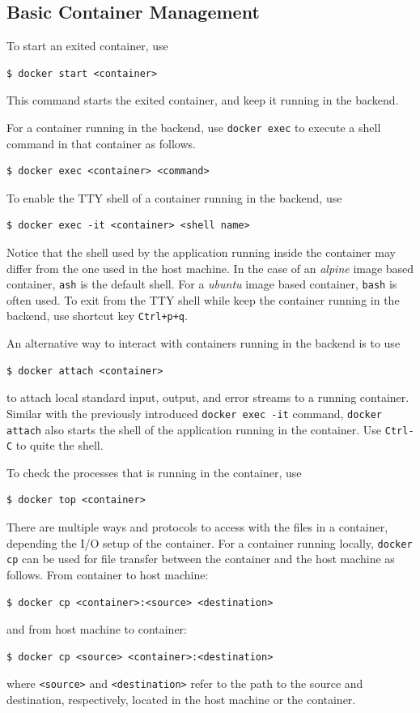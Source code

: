 \subsection{Basic Container Management}

To start an exited container, use
\begin{lstlisting}
$ docker start <container>
\end{lstlisting}
This command starts the exited container, and keep it running in the backend.

For a container running in the backend, use \verb|docker exec| to execute a shell command in that container as follows.
\begin{lstlisting}
$ docker exec <container> <command>
\end{lstlisting}

To enable the TTY shell of a container running in the backend, use
\begin{lstlisting}
$ docker exec -it <container> <shell name>
\end{lstlisting}
Notice that the shell used by the application running inside the container may differ from the one used in the host machine. In the case of an \textit{alpine} image based container, \verb|ash| is the default shell. For a \textit{ubuntu} image based container, \verb|bash| is often used. To exit from the TTY shell while keep the container running in the backend, use shortcut key \verb|Ctrl+p+q|.

An alternative way to interact with containers running in the backend is to use
\begin{lstlisting}
$ docker attach <container>
\end{lstlisting}
to attach local standard input, output, and error streams to a running container. Similar with the previously introduced \texttt{docker exec -it} command, \texttt{docker attach} also starts the shell of the application running in the container. Use \verb|Ctrl-C| to quite the shell.

To check the processes that is running in the container, use
\begin{lstlisting}
$ docker top <container>
\end{lstlisting}

There are multiple ways and protocols to access with the files in a container, depending the I/O setup of the container. For a container running locally, \verb|docker cp| can be used for file transfer between the container and the host machine as follows. From container to host machine:
\begin{lstlisting}
$ docker cp <container>:<source> <destination>
\end{lstlisting}
and from host machine to container:
\begin{lstlisting}
$ docker cp <source> <container>:<destination>
\end{lstlisting}
where \verb|<source>| and \verb|<destination>| refer to the path to the source and destination, respectively, located in the host machine or the container.

